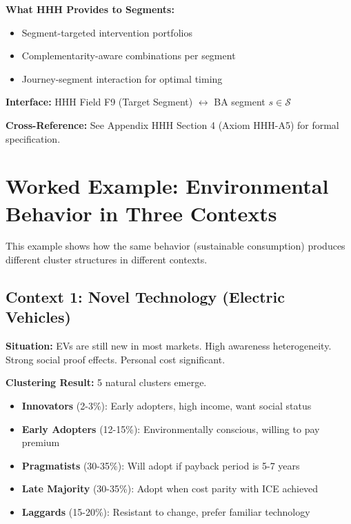 \begin{tcolorbox}[colback=orange!5!white, colframe=orange!75!black,
    title=\textbf{Integration: Segments $\leftrightarrow$ HHH (Intervention Toolkit)}]
\textbf{What HHH Provides to Segments:}
\begin{itemize}[nosep]
\item Segment-targeted intervention portfolios
\item Complementarity-aware combinations per segment
\item Journey-segment interaction for optimal timing
\end{itemize}

\textbf{Interface:} HHH Field F9 (Target Segment) $\leftrightarrow$ BA segment $s \in \mathcal{S}$

\textbf{Cross-Reference:} See Appendix HHH Section 4 (Axiom HHH-A5) for formal specification.

\end{tcolorbox}

\section{Worked Example: Environmental Behavior in Three Contexts}
\label{sec:ba-example}

This example shows how the same behavior (sustainable consumption) produces
different cluster structures in different contexts.

\subsection{Context 1: Novel Technology (Electric Vehicles)}

\textbf{Situation:} EVs are still new in most markets. High awareness heterogeneity.
Strong social proof effects. Personal cost significant.

\textbf{Clustering Result:} 5 natural clusters emerge.

\begin{itemize}[nosep]
\item \textbf{Innovators} (2-3\%): Early adopters, high income, want social status
\item \textbf{Early Adopters} (12-15\%): Environmentally conscious, willing to pay premium
\item \textbf{Pragmatists} (30-35\%): Will adopt if payback period is 5-7 years
\item \textbf{Late Majority} (30-35\%): Adopt when cost parity with ICE achieved
\item \textbf{Laggards} (15-20\%): Resistant to change, prefer familiar technology
\end{itemize}

